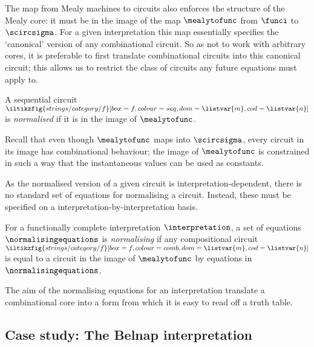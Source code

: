 The map from Mealy machines to circuits also enforces the structure of the
Mealy core: it must be in the image of the map \(\mealytofunc\) from \(\funci\)
to \(\scircsigma\).
For a given interpretation this map essentially specifies the `canonical'
version of any combinational circuit.
So as not to work with arbitrary cores, it is preferable to first translate
combinational circuits into this canonical circuit; this allows us to restrict
the class of circuits any future equations must apply to.

\begin{definition}
    A sequential circuit \(
    \iltikzfig{strings/category/f}[box=f,colour=seq,dom=\listvar{m},cod=\listvar{n}]
    \) is \emph{normalised} if it is in the image of \(\mealytofunc\).
\end{definition}

\begin{remark}
    Recall that even though \(\mealytofunc\) maps into \(\scircsigma\), every
    circuit in its image has combinational behaviour; the image of
    \(\mealytofunc\) is constrained in such a way that the instantaneous values
    can be used as constants.
\end{remark}

As the normalised version of a given circuit is interpretation-dependent, there
is no standard set of equations for normalising a circuit.
Instead, these must be specified on a interpretation-by-interpretation basis.

\begin{definition}
    For a functionally complete interpretation \(\interpretation\), a set of
    equations \(\normalisingequations\) is \emph{normalising} if any
    compositional circuit \(
    \iltikzfig{strings/category/f}[box=f,colour=comb,dom=\listvar{m},cod=\listvar{n}]
    \) is equal to a circuit in the image of \(\mealytofunc\) by equations in
    \(\normalisingequations\).
\end{definition}

The aim of the normalising equations for an interpretation translate a
combinational core into a form from which it is easy to read off a truth table.

\subsection{Case study: The Belnap interpretation}\label{sec:algebraic-case-study}

